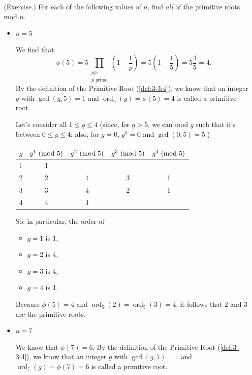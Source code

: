 \documentclass[letterpaper]{article}
\DeclareMathOperator{\ord}{ord}
\begin{document}
\begin{mdframed}
    (Exercise.) For each of the following values of $n$, find \emph{all} of the primitive roots mod $n$. 
    \begin{itemize}
        \item $n = 5$
        \begin{mdframed}
            We find that \[\phi(5) = 5\prod_{\substack{p | 5 \\ p \text{ prime}}} \left(1 - \frac{1}{p}\right) = 5\left(1 - \frac{1}{5}\right) = 5\frac{4}{5} = 4.\]
            By the definition of the Primitive Root (\ref{def:3-3:4}), we know that an integer $g$ with $\gcd(g, 5) = 1$ and $\ord_{5}(g) = \phi(5) = 4$ is called a primitive root.
            
            \bigskip 
            
            Let's consider all $1 \leq g \leq 4$ (since, for $g > 5$, we can mod $g$ such that it's between $0 \leq g \leq 4$; also, for $g = 0$, $g^n = 0$ and $\gcd(0, 5) = 5$.)

            \begin{center}
                \begin{tabular}{|c|c c c c|}
                    \hline 
                    $g$ & $g^1 \ (\mathrm{mod}\ 5)$ & $g^2 \ (\mathrm{mod}\ 5)$ & $g^3 \ (\mathrm{mod}\ 5)$ & $g^4 \ (\mathrm{mod}\ 5)$ \\ 
                    \hline 
                    1   & 1             &               &               &               \\ 
                    2   & 2             & 4             & 3             & 1             \\ 
                    3   & 3             & 4             & 2             & 1             \\ 
                    4   & 4             & 1             &               &               \\ 
                    \hline 
                \end{tabular}
            \end{center}
            So, in particular, the order of  
            \begin{itemize}
                \item $g = 1$ is 1, 
                \item $g = 2$ is 4, 
                \item $g = 3$ is 4,
                \item $g = 4$ is 1.
            \end{itemize}
            Because $\phi(5) = 4$ and $\ord_{5}(2) = \ord_{5}(3) = 4$, it follows that 2 and 3 are the primitive roots. 
        \end{mdframed}
        \item $n = 7$
        \begin{mdframed}
            We know that $\phi(7) = 6$. By the definition of the Primitive Root (\ref{def:3-3:4}), we know that an integer $g$ with $\gcd(g, 7) = 1$ and $\ord_{7}(g) = \phi(7) = 6$ is called a primitive root. 
            

\end{mdframed}
\end{itemize}
\end{mdframed}
\end{document}
